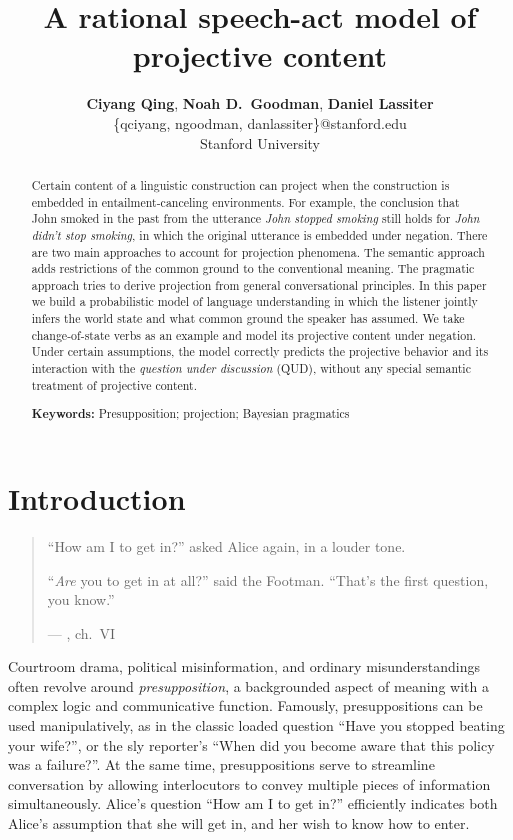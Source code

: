 \documentclass[10pt,letterpaper]{article}
\title{A rational speech-act model of projective content}
\author{{\large \bf Ciyang Qing}, {\large \bf Noah D.~Goodman}, {\large \bf Daniel Lassiter}\\
\{qciyang, ngoodman, danlassiter\}@stanford.edu\\
Stanford University}
\begin{document}
\maketitle
 
\begin{abstract}
Certain content of a linguistic construction can project when the construction is embedded in entailment-canceling environments.
 For example, the conclusion that John smoked in the past from the utterance \emph{John stopped smoking} 
 still holds for \emph{John didn't stop smoking}, in which the original utterance is 
 embedded under negation. 
 There are two main approaches to account for projection phenomena. 
 The semantic approach adds restrictions of the common ground to the conventional meaning.
 The pragmatic approach tries to derive projection from general conversational principles. 
 In this paper we build a probabilistic model of language understanding in which the listener 
  jointly infers the world state and what common ground the speaker has assumed. 
 We take change-of-state verbs as an example and model its projective content under negation. 
 Under certain assumptions, the model correctly predicts the projective behavior and its interaction with 
  the \emph{question under discussion} (QUD), without any special semantic treatment of projective content.

\textbf{Keywords:} 
Presupposition; projection; Bayesian pragmatics
\end{abstract}

\section{Introduction}
\label{sec:Intro}

\begin{quotation}
\noindent ``How am I to get in?'' asked Alice again, in a louder tone.

\noindent ``\emph{Are} you to get in at all?'' said the Footman. ``That's the first question, you know.'' 
\begin{flushright}
--- , ch.\ VI
\end{flushright}
\end{quotation}

Courtroom drama, political misinformation, and ordinary misunderstandings often revolve around \emph{presupposition}, a backgrounded aspect of meaning with a complex logic and communicative function. Famously, presuppositions can be used manipulatively, as in the classic loaded question ``Have you stopped beating your wife?'', or the sly reporter's ``When did you become aware that this policy was a failure?''. At the same time, presuppositions serve to streamline conversation by allowing interlocutors to convey multiple pieces of information simultaneously. Alice's question ``How am I to get in?'' efficiently indicates both Alice's assumption that she will get in, and her wish to know how to enter.
\end{document}
